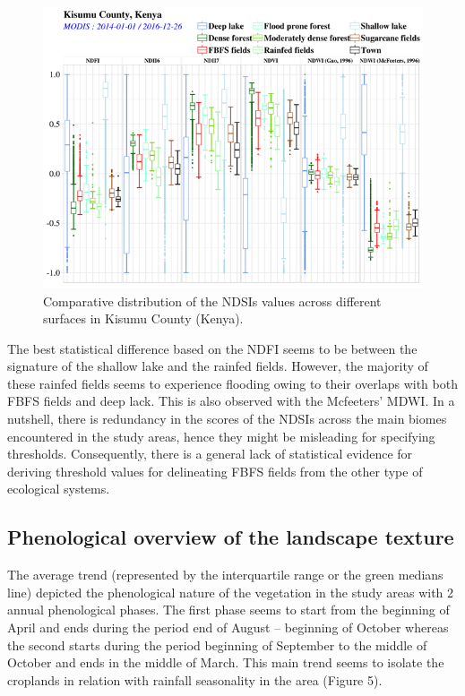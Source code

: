 \documentclass[12pt,oneside]{article}
\begin{document}
\begin{figure}
\includegraphics[width=1\linewidth]{figures/Mapping_FBFS_ndsi_accross_features} \caption{Comparative distribution of the NDSIs values across different surfaces in Kisumu County (Kenya).}\label{fig:fig4}
\end{figure}

The best statistical difference based on the NDFI seems to be between
the signature of the shallow lake and the rainfed fields. However, the
majority of these rainfed fields seems to experience flooding owing to
their overlaps with both FBFS fields and deep lack. This is also
observed with the Mcfeeters' MDWI. In a nutshell, there is redundancy in
the scores of the NDSIs across the main biomes encountered in the study
areas, hence they might be misleading for specifying thresholds.
Consequently, there is a general lack of statistical evidence for
deriving threshold values for delineating FBFS fields from the other
type of ecological systems.

\hypertarget{II.2}{%
\subsection{Phenological overview of the landscape texture}\label{II.2}}

The average trend (represented by the interquartile range or the green
medians line) depicted the phenological nature of the vegetation in the
study areas with 2 annual phenological phases. The first phase seems to
start from the beginning of April and ends during the period end of
August -- beginning of October whereas the second starts during the
period beginning of September to the middle of October and ends in the
middle of March. This main trend seems to isolate the croplands in
relation with rainfall seasonality in the area (Figure 5).
\end{document}
